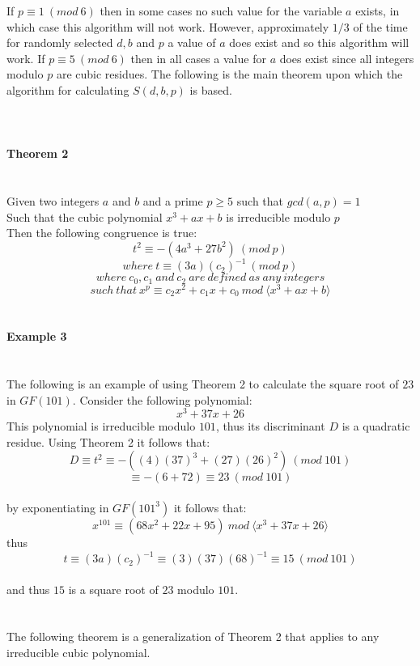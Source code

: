 \documentclass[final,letterpaper,oneside,10pt]{article}
\begin{document}
If $p \equiv 1~(mod~6)$ then in some cases no such value for the variable $a$ exists, in which case this algorithm will not work.  However,
approximately $1/3$ of the time for randomly selected $d,b$ and $p$ a value of $a$ does exist and so this algorithm will work.  If $p\equiv 5~(mod~6)$
then in all cases a value for $a$ does exist since all integers modulo $p$ are cubic residues.  The following is the main theorem upon which the algorithm
for calculating $S(d,b,p)$ is based.
\\
\\
\\
\\
\textbf{Theorem 2}
\\
\\
\\
Given two integers $a$ and $b$ and a prime $p \ge 5$ such that $gcd(a,p) =1$
\\
Such that the cubic polynomial $x^3+ax+b$ is irreducible modulo $p$
\\
Then the following congruence is true:
\\
\[t^2 \equiv -(4a^3+27b^2)~(mod~p)\]
\[where~ t \equiv (3a)(c_2)^{-1}~(mod~p)\]
\[where~ c_0, c_1~ and~ c_2 ~are~ defined~ as ~any~integers\]
\[such~that~x^p \equiv c_2x^2 + c_1x + c_0~ mod~ \langle x^3 + ax + b \rangle\]
\\
\\
\textbf{Example 3}
\\
\\
\\
The following is an example of using Theorem 2 to calculate the square root of $23$ in $GF(101)$.  Consider the following polynomial:
\[x^3+37x+26\]
This polynomial is irreducible modulo $101$, thus its discriminant $D$ is a quadratic residue.  Using Theorem 2 it follows that:
\\
\[D \equiv t^2 \equiv -((4)(37)^3 + (27)(26)^2)~(mod~101)\]
\[\equiv-(6+72) \equiv 23~(mod~101)\]
\\
by exponentiating in $GF(101^3)$ it follows that:
\\
\[x^{101}\equiv (68x^2+22x+95) ~mod~\langle x^3 + 37x + 26 \rangle \]
thus
\\
\[t \equiv (3a)(c_2)^{-1} \equiv (3)(37)(68)^{-1} \equiv 15~(mod~101) \]
\\
and thus $15$ is a square root of $23$ modulo $101$.
\\
\\
\\
The following theorem is a generalization of Theorem 2 that applies to any irreducible cubic polynomial.
\end{document}
